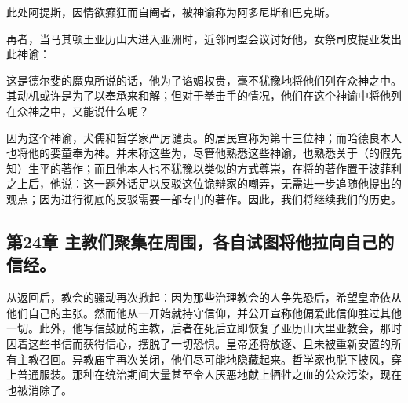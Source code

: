 \par

此处阿提斯，因情欲癫狂而自阉者，被神谕称为阿多尼斯和巴克斯。\par

再者，当马其顿王亚历山大进入亚洲时，近邻同盟会议讨好他，女祭司皮提亚发出此神谕：\par

\par

这是德尔斐的魔鬼所说的话，他为了谄媚权贵，毫不犹豫地将他们列在众神之中。其动机或许是为了以奉承来和解；但对于拳击手的情况，他们在这个神谕中将他列在众神之中，又能说什么呢？\par

\par

因为这个神谕，犬儒和哲学家严厉谴责。的居民宣称为第十三位神；而哈德良本人也将他的娈童奉为神。并未称这些为，尽管他熟悉这些神谕，也熟悉关于（的假先知）生平的著作；而且他本人也不犹豫以类似的方式尊崇，在将的著作置于波菲利之上后，他说：这一题外话足以反驳这位诡辩家的嘲弄，无需进一步追随他提出的观点；因为进行彻底的反驳需要一部专门的著作。因此，我们将继续我们的历史。\par


\subsection{第24章 主教们聚集在周围，各自试图将他拉向自己的信经。}

从返回后，教会的骚动再次掀起：因为那些治理教会的人争先恐后，希望皇帝依从他们自己的主张。然而他从一开始就持守信仰，并公开宣称他偏爱此信仰胜过其他一切。此外，他写信鼓励的主教，后者在死后立即恢复了亚历山大里亚教会，那时因着这些书信而获得信心，摆脱了一切恐惧。皇帝还将放逐、且未被重新安置的所有主教召回。异教庙宇再次关闭，他们尽可能地隐藏起来。哲学家也脱下披风，穿上普通服装。那种在统治期间大量甚至令人厌恶地献上牺牲之血的公众污染，现在也被消除了。\par

